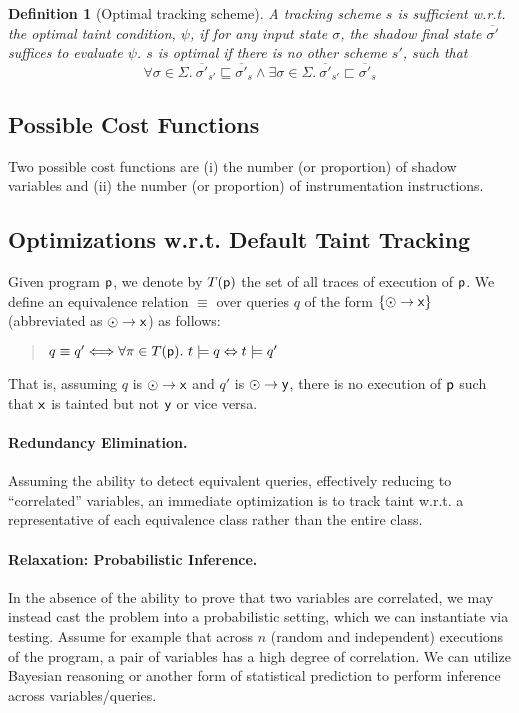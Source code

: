 \documentclass[]{article}
\newtheorem{defn}{Definition}
\begin{document}
{\begin{defn}[Optimal tracking scheme] A tracking scheme $s$ is \emph{sufficient} w.r.t. the optimal taint condition, $\psi$, if for any input state $\sigma$, the shadow final state $\overline{\sigma'}$ suffices to evaluate $\psi$. $s$ is \emph{optimal} if there is no other scheme $s'$, such that
	$$
	\forall \sigma \in \Sigma.\ \overline{\sigma'}_{s'} \sqsubseteq  \overline{\sigma'}_{s} \wedge \exists \sigma \in \Sigma.\ \overline{\sigma'}_{s'} \sqsubset  \overline{\sigma'}_{s}
	$$
	
\end{defn}

\subsection{Possible Cost Functions}

Two possible cost functions are (i) the number (or proportion) of shadow variables and (ii) the number (or proportion) of instrumentation instructions.

\subsection{Optimizations w.r.t. Default Taint Tracking} 

Given program ${\sf p}$, we denote by $T({\sf p})$ the set of all traces of execution of ${\sf p}$. We define an equivalence relation $\equiv$ over queries $q$ of the form $\{ \odot \rightarrow {\sf x} \}$ (abbreviated as $\odot \rightarrow {\sf x}$) as follows:
\begin{quote}
$q \equiv q'
\Longleftrightarrow \forall \pi \in T({\sf p}).\ t \models q \Leftrightarrow t \models q'$
\end{quote}
That is, assuming $q$ is $\odot \rightarrow {\sf x}$ and $q'$
is $\odot \rightarrow {\sf y}$, there is no execution of ${\sf p}$ such that ${\sf x}$ is tainted but not ${\sf y}$ or vice versa.
 
\paragraph{Redundancy Elimination.} Assuming the ability to detect equivalent queries, effectively reducing to ``correlated'' variables, an immediate optimization is to track taint w.r.t. a representative of each equivalence class rather than the entire class.

\paragraph{Relaxation: Probabilistic Inference.} In the absence of the ability to prove that two variables are correlated, we may instead cast the problem into a probabilistic setting, which we can instantiate via testing. Assume for example that across $n$ (random and independent) executions of the program, a pair of variables has a high degree of correlation. We can utilize Bayesian reasoning or another form of statistical prediction to perform inference across variables/queries.

}
\end{document}
